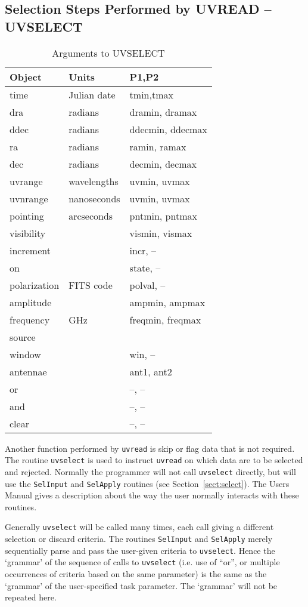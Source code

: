 \documentclass{report}
\begin{document}
\subsection{Selection Steps Performed by UVREAD -- UVSELECT}
\begin{table}\centering
\begin{tabular}{|l|l|l|}				   \hline
\bf Object	& \bf Units	& \bf P1,P2 		\\ \hline
time		& Julian date	& tmin,tmax		\\
dra		& radians	& dramin, dramax	\\
ddec		& radians	& ddecmin, ddecmax	\\
ra		& radians	& ramin, ramax		\\
dec		& radians	& decmin, decmax	\\
uvrange		& wavelengths	& uvmin, uvmax		\\
uvnrange	& nanoseconds	& uvmin, uvmax		\\
pointing	& arcseconds	& pntmin, pntmax	\\
visibility	&		& vismin, vismax	\\
increment	&		& incr, --		\\
on		&		& state, --		\\
polarization	& FITS code	& polval, --		\\
amplitude	&		& ampmin, ampmax	\\
frequency	& GHz		& freqmin, freqmax	\\
source		&		&			\\
window		& 		& win, --		\\
antennae	&		& ant1, ant2		\\
or		&		& --, --		\\
and		&		& --, --		\\
clear		&		& --, --		\\ \hline
\end{tabular}
\caption{Arguments to UVSELECT}
\label{t:uvselect}
\end{table}
Another function performed by {\tt uvread} is skip or flag data that is not
required. The routine {\tt uvselect} is used to instruct {\tt uvread} on
which data are to be selected and rejected. Normally the programmer will
not call {\tt uvselect} directly, but will use the {\tt SelInput} and
{\tt SelApply} routines (see Section~\ref{sect:select}). The Users Manual gives a description
about the way the user normally interacts with these routines.

Generally {\tt uvselect} will be
called many times, each call giving a different selection or discard criteria.
The routines {\tt SelInput} and {\tt SelApply} merely sequentially parse and pass
the user-given
criteria to {\tt uvselect}. Hence the `grammar' of the sequence of calls to
{\tt uvselect} (i.e. use of ``or'', or multiple occurrences of
criteria based on the same parameter) is the same as the `grammar' of the
user-specified task parameter. The `grammar' will not be repeated here.
\end{document}
